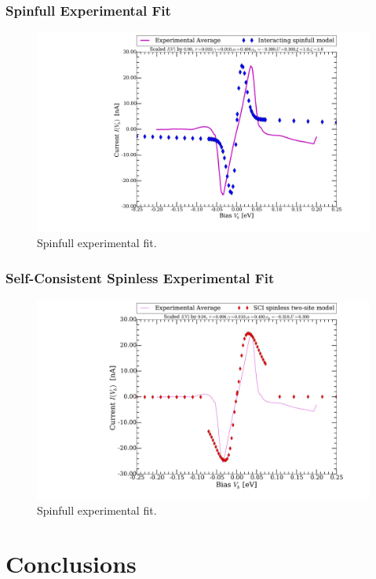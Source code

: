 \begin{frame}
    \frametitle{Spinfull Experimental Fit}
    \vspace{-3mm}
    \begin{figure}[!b] 
        \centering
        \includegraphics[height=.75\textheight, width=\textwidth]{res/spinfull.pdf}
        \vspace{-6mm}
        \caption{Spinfull experimental fit.}
    \end{figure} 
\end{frame}
\begin{frame}
    \frametitle{Self-Consistent Spinless Experimental Fit}
    \vspace{-3mm}
    \begin{figure}[!b] 
        \centering
        \includegraphics[height=.75\textheight, width=\textwidth]{res/selfconsistent.pdf}
        \vspace{-6mm}
        \caption{Spinfull experimental fit.}
    \end{figure} 
\end{frame}
\section{Conclusions}
